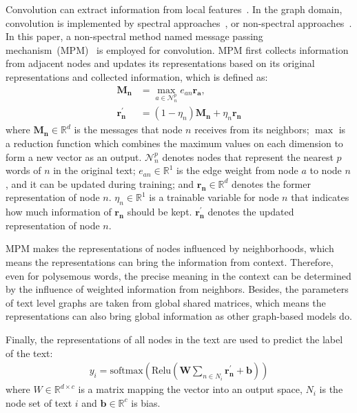\documentclass[11pt,a4paper]{article}
\begin{document}
Convolution can extract information from local features~\cite{lecun1989backpropagation}. In the graph domain, convolution is implemented by spectral approaches~\cite{bruna2013spectral, henaff2015deep}, or non-spectral approaches~\cite{duvenaud2015convolutional}. In this paper, a non-spectral method named message passing mechanism~(MPM)~\cite{gilmer2017neural} is employed for convolution. MPM first collects information from adjacent nodes and updates its representations based on its original representations and collected information, which is defined as:
\begin{align}
\mathbf{M_n} &=  \max \limits_{a\in \mathcal{N}_n^p} e_{an}\mathbf{r_a} \label{message}, \\
\mathbf{r_n^{\prime}} &= (1-\eta_{n})\mathbf{M_n} + \eta_{n}\mathbf{r_n} \label{update}
\end{align}
where $\mathbf{M_n}\in \mathbb{R}^{d}$ is the messages that node $n$ receives from its neighbors; $\max$ is a reduction function which combines the maximum values on each dimension to form a new vector as an output.  $\mathcal{N}_n^p$ denotes nodes that represent the nearest $p$ words of $n$ in the original text; $e_{an} \in \mathbb{R}^1$ is the edge weight from node $a$ to node $n$, and it can be updated during training; and $\mathbf{r_n} \in \mathbb{R}^{d}$ denotes the former representation of node $n$.  $\eta_n \in \mathbb{R}^{1}$ is a trainable variable for node $n$ that indicates how much information of  $\mathbf{r_n}$ should be kept. $\mathbf{r_n^{\prime}}$ denotes the updated representation of node $n$.



MPM makes the representations of nodes influenced by neighborhoods, which means the representations can bring the information from context. Therefore, even for polysemous words, the precise meaning in the context can be determined by the influence of weighted information from neighbors. Besides, the parameters of text level graphs are taken from global shared matrices, which means the representations can also bring global information as other graph-based models do. 

Finally, the representations of all nodes in the text are used to predict the label of the text:
\begin{align}
    y_i = \textrm{softmax}(\textrm{Relu}(\mathbf{W}\sum_{n\in N_i}\mathbf{r_n^{\prime}} + \mathbf{b}))
\end{align}
where $W\in \mathbb{R}^{d\times c}$ is a matrix mapping the vector into an output space, $N_i$ is the node set of text $i$ and $\mathbf{b}\in \mathbb{R}^{c}$ is bias. 
\end{document}
